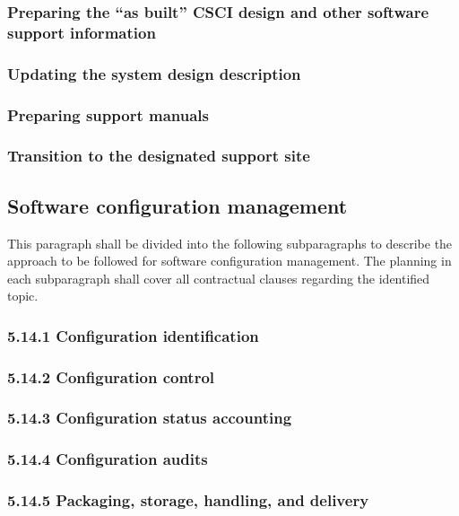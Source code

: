 \documentclass{fidata-report-template}
\begin{document}
\subsubsection{Preparing the ``as built'' CSCI design and other
software support information}

\subsubsection{Updating the system design description}

\subsubsection{Preparing support manuals}

\subsubsection{Transition to the designated support site}

\subsection{Software configuration management}

This paragraph shall be divided into the following subparagraphs to
describe the approach to be followed for software configuration
management. The planning in each subparagraph shall cover all
contractual clauses regarding the identified topic.

\subsubsection{5.14.1 Configuration identification}

\subsubsection{5.14.2 Configuration control}

\subsubsection{5.14.3 Configuration status accounting}

\subsubsection{5.14.4 Configuration audits}

\subsubsection{5.14.5 Packaging, storage, handling, and delivery}
\end{document}
